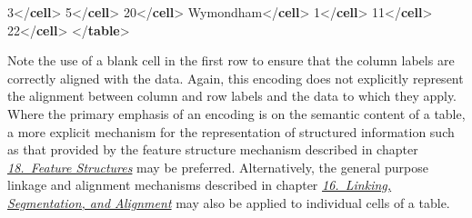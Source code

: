 \begin{shaded}
\hspace*{1em}3{</\textbf{cell}>}\mbox{}\newline 
\hspace*{1em}5{</\textbf{cell}>}\mbox{}\newline 
\hspace*{1em}20{</\textbf{cell}>}\mbox{}\newline 
{}\mbox{}\newline 
{}\mbox{}\newline 
\hspace*{1em}Wymondham{</\textbf{cell}>}\mbox{}\newline 
\hspace*{1em}1{</\textbf{cell}>}\mbox{}\newline 
\hspace*{1em}11{</\textbf{cell}>}\mbox{}\newline 
\hspace*{1em}22{</\textbf{cell}>}\mbox{}\newline 
{}\mbox{}\newline 
{</\textbf{table}>}\end{shaded}\egroup\par \par
Note the use of a blank cell in the first row to ensure that the column labels are correctly aligned with the data. Again, this encoding does not explicitly represent the alignment between column and row labels and the data to which they apply. Where the primary emphasis of an encoding is on the semantic content of a table, a more explicit mechanism for the representation of structured information such as that provided by the feature structure mechanism described in chapter \textit{\hyperref[FS]{18.\ Feature Structures}} may be preferred. Alternatively, the general purpose linkage and alignment mechanisms described in chapter \textit{\hyperref[SA]{16.\ Linking, Segmentation, and Alignment}} may also be applied to individual cells of a table.\par
